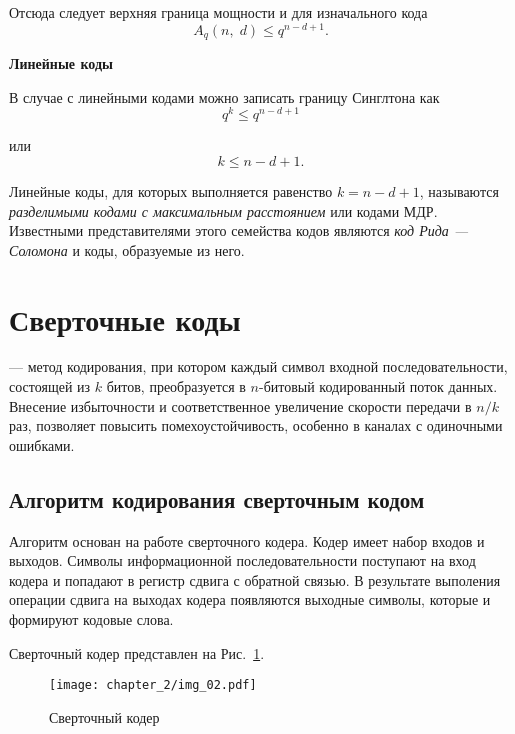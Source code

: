 Отсюда следует верхняя граница мощности и для изначального кода
$$A_q(n,\;d)\leqslant q^{n-d+1}.$$

\textbf{Линейные коды}

В случае с линейными кодами можно записать границу Синглтона как
$$q^k\leqslant q^{n-d+1}$$

или
$$k\leqslant n-d+1.$$

Линейные коды, для которых выполняется равенство $k=n-d+1$, называются \textit{разделимыми
кодами с максимальным расстоянием} или кодами МДР. Известными представителями этого семейства
кодов являются \textit{код Рида — Соломона} и коды, образуемые из него.

\section{Сверточные коды}

\begin{definition} 
 --- метод кодирования, при котором каждый символ входной последовательности, 
состоящей из $k$ битов, преобразуется в $n$-битовый кодированный поток данных. Внесение избыточности и 
соответственное увеличение скорости передачи в $n/k$ раз, позволяет повысить помехоустойчивость, особенно в 
каналах с одиночными ошибками.
\end{definition}

\subsection{Алгоритм кодирования сверточным кодом}
Алгоритм основан на работе сверточного кодера. Кодер имеет набор входов и выходов. Символы информационной
последовательности поступают на вход кодера и попадают в регистр сдвига с обратной связью. В результате
выполения операции сдвига на выходах кодера появляются выходные символы, которые и формируют кодовые слова.

Сверточный кодер представлен на Рис.~\ref{img_02}.

\begin{figure}[htbp]
\begin{center}
\texttt{[image: chapter\_2/img\_02.pdf]}
\end{center}
\caption{Сверточный кодер}
\label{img_02}
\end{figure}

